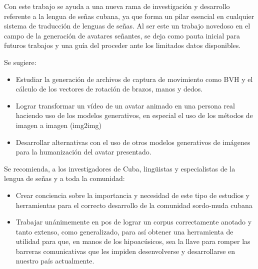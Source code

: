 \begin{recomendations}

Con este trabajo se ayuda a una nueva rama de investigación y desarrollo referente a la lengua de señas cubana, ya que forma un pilar esencial en cualquier sistema de traducción de lenguas de señas. Al ser este un trabajo novedoso en el campo de la generación de avatares señantes, se deja como pauta inicial para futuros trabajos y una guía del proceder ante los limitados datos disponibles.

Se sugiere:
\begin{itemize}
\item Estudiar la generación de archivos de captura de movimiento como BVH  y el cálculo de los vectores de rotación de brazos, manos y dedos.
\item Lograr transformar un vídeo de un avatar animado en una persona real haciendo uso de los modelos generativos, en especial el uso de los métodos de imagen a imagen (img2img)
\item Desarrollar alternativas con el uso de otros modelos generativos de imágenes para la humanización del avatar presentado.
\end{itemize}
 Se recomienda, a los investigadores de Cuba, lingüistas y especialistas de la lengua de señas y a toda la comunidad:
 \begin{itemize}
 \item Crear conciencia sobre la importancia y necesidad de este tipo de estudios y herramientas para el correcto desarrollo de la comunidad sordo-muda cubana
 \item Trabajar unánimemente en pos de lograr un corpus correctamente anotado y tanto extenso, como generalizado, para así obtener una herramienta de utilidad para que, en manos de los hipoacúsicos, sea la llave para romper las barreras comunicativas que les impiden desenvolverse y desarrollarse en nuestro país actualmente. 
\end{itemize}  
\end{recomendations}
